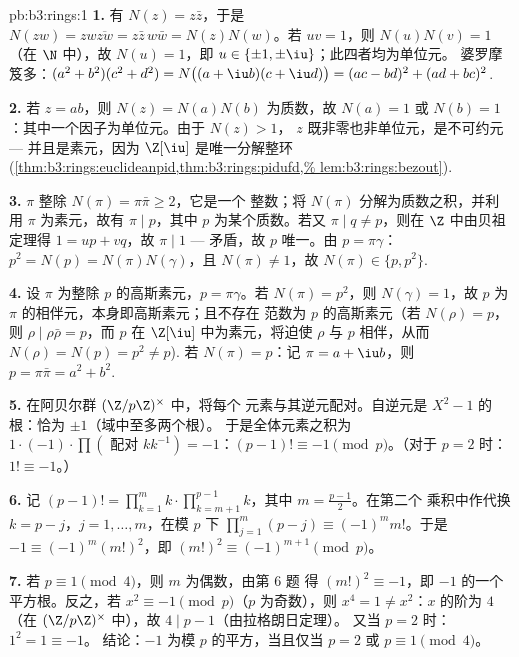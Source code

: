 \begin{solution}{pb:b3:rings:1}
\textbf{1.} 有 $N(z) = z\bar z$，于是 $N(zw) = zw\overline{zw} = z\bar
z\, w \bar w = N(z)N(w)$。若 $uv = 1$，则 $N(u)N(v) = 1$（在 $\N$ 中），故
$N(u) = 1$，即 $u \in \{\pm 1, \pm \iu\}$；此四者均为单位元。
婆罗摩笈多：$(a^2+b^2)(c^2+d^2) = N\bigl((a + \iu b)(c + \iu
d)\bigr) = (ac - bd)^2 + (ad + bc)^2$.

\textbf{2.} 若 $z = ab$，则 $N(z) = N(a)N(b)$ 为质数，故
$N(a) = 1$ 或 $N(b) = 1$：其中一个因子为单位元。由于 $N(z) > 1$，
$z$ 既非零也非单位元，是不可约元 --- 并且是素元，因为
$\Z[\iu]$ 是唯一分解整环
(\cref{thm:b3:rings:euclideanpid,thm:b3:rings:pidufd,%
lem:b3:rings:bezout}).

\textbf{3.} $\pi$ 整除 $N(\pi) = \pi\bar\pi \geq 2$，它是一个
整数；将 $N(\pi)$ 分解为质数之积，并利用
$\pi$ 为素元，故有 $\pi \mid p$，其中 $p$ 为某个质数。若又
$\pi \mid q \neq p$，则在 $\Z$ 中由贝祖定理得 $1 = up + vq$，故
$\pi \mid 1$ --- 矛盾，故 $p$ 唯一。由 $p = \pi\gamma$：
$p^2 = N(p) = N(\pi)N(\gamma)$，且 $N(\pi) \neq 1$，故 $N(\pi)
\in \{p, p^2\}$.

\textbf{4.} 设 $\pi$ 为整除 $p$ 的高斯素元，$p =
\pi\gamma$。若 $N(\pi) = p^2$，则 $N(\gamma) = 1$，故 $p$ 为
$\pi$ 的相伴元，本身即高斯素元；且不存在
范数为 $p$ 的高斯素元（若 $N(\rho) = p$，则 $\rho \mid
\rho\bar\rho = p$，而 $p$ 在 $\Z[\iu]$ 中为素元，将迫使
$\rho$ 与 $p$ 相伴，从而 $N(\rho) = N(p) = p^2 \neq
p$).
若 $N(\pi) = p$：记 $\pi = a + \iu b$，则 $p = \pi\bar\pi = a^2
+ b^2$.

\textbf{5.} 在阿贝尔群 $(\Z/p\Z)^\times$ 中，将每个
元素与其逆元配对。自逆元是
$X^2 - 1$ 的根：恰为 $\pm 1$（域中至多两个根）。
于是全体元素之积为 $1 \cdot (-1) \cdot \prod
(\text{ 配对 } k k^{-1}) = -1$：$(p-1)! \equiv -1 \pmod p$。（对于
$p = 2$ 时：$1! \equiv -1$。）

\textbf{6.} 记 $(p-1)! = \prod_{k=1}^m k \cdot
\prod_{k=m+1}^{p-1}k$，其中 $m = \frac{p-1}2$。在第二个
乘积中作代换 $k = p - j$，$j = 1, \dots, m$，在模 $p$ 下
$\prod_{j=1}^m (p - j) \equiv (-1)^m m!$。于是 $-1 \equiv
(-1)^m (m!)^2$，即 $(m!)^2 \equiv (-1)^{m+1} \pmod p$。

\textbf{7.} 若 $p \equiv 1 \pmod 4$，则 $m$ 为偶数，由第 6 题
得 $(m!)^2 \equiv -1$，即 $-1$ 的一个平方根。反之，若
$x^2 \equiv -1 \pmod p$（$p$ 为奇数），则 $x^4 = 1 \neq x^2$：$x$
的阶为 $4$（在 $(\Z/p\Z)^\times$ 中），故 $4 \mid p - 1$（由拉格朗日定理）。
又当 $p = 2$ 时：$1^2 = 1 \equiv -1$。
结论：$-1$ 为模 $p$ 的平方，当且仅当 $p = 2$ 或 $p \equiv 1 \pmod 4$。


\end{solution}
